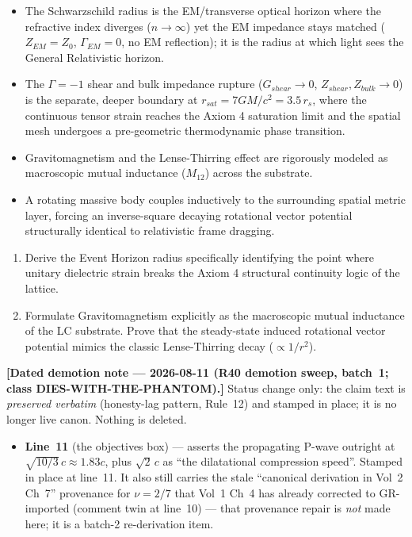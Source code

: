 \begin{summarybox}
\begin{itemize}
    \item The Schwarzschild radius is the EM/transverse optical horizon where the refractive index diverges ($n \to \infty$) yet the EM impedance stays matched ($Z_{EM}=Z_0$, $\Gamma_{EM}=0$, no EM reflection); it is the radius at which light sees the General Relativistic horizon.
    \item The $\Gamma=-1$\gammaundeclared{} shear and bulk impedance rupture ($G_{shear}\to0$, $Z_{shear},Z_{bulk}\to0$) is the separate, deeper boundary at $r_{sat}=7GM/c^2=3.5\,r_s$, where the continuous tensor strain reaches the Axiom 4 saturation limit and the spatial mesh undergoes a pre-geometric thermodynamic phase transition.
    \item Gravitomagnetism and the Lense-Thirring effect are rigorously modeled as macroscopic mutual inductance ($M_{12}$) across the substrate.
    \item A rotating massive body couples inductively to the surrounding spatial metric layer, forcing an inverse-square decaying rotational vector potential structurally identical to relativistic frame dragging.
\end{itemize}
\end{summarybox}

\begin{exercisebox}
\begin{enumerate}
    \item Derive the Event Horizon radius specifically identifying the point where unitary dielectric strain breaks the Axiom 4 structural continuity logic of the lattice.
    \item Formulate Gravitomagnetism explicitly as the macroscopic mutual inductance of the LC substrate. Prove that the steady-state induced rotational vector potential mimics the classic Lense-Thirring decay ($\propto 1/r^2$).
\end{enumerate}
\end{exercisebox}

\medskip
\noindent\textbf{[Dated demotion note --- 2026-08-11 (R40 demotion sweep, batch~1;
class DIES-WITH-THE-PHANTOM).]} Status change only: the claim text is \emph{preserved
verbatim} (honesty-lag pattern, Rule~12) and stamped in place; it is no longer live canon.
Nothing is deleted.

\begin{itemize}
  \item \textbf{Line~11} (the objectives box) --- asserts the propagating P-wave outright at $\sqrt{10/3}\,c \approx 1.83c$, plus $\sqrt2\,c$ as ``the dilatational compression speed''. Stamped in place at line~11. It also still carries the stale ``canonical derivation in Vol~2 Ch~7'' provenance for $\nu = 2/7$ that Vol~1 Ch~4 has already corrected to GR-imported (comment twin at line~10) --- that provenance repair is \emph{not} made here; it is a batch-2 re-derivation item.
\end{itemize}

